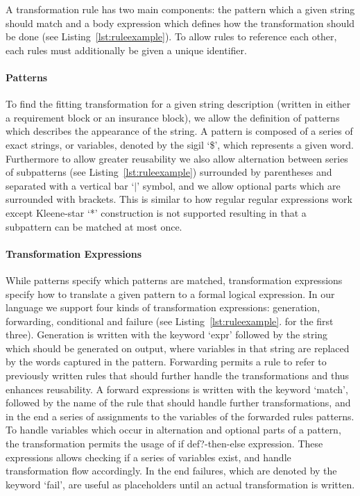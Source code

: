 A transformation rule has two main components: the pattern which a given
string should match and a body expression which defines how the
transformation should be done (see Listing~\ref{lst:ruleexample}).
To allow rules to reference each other, each rules must additionally be
given a unique identifier.

\paragraph{Patterns}
\label{par:Patterns}

To find the fitting transformation for a given string description
(written in either a requirement block or an insurance block), we allow the
definition of patterns which describes the appearance of the string.
A pattern is composed of a series of exact strings, or variables,
denoted by the sigil `\$', which represents a given word.
Furthermore to allow greater reusability we also allow alternation between
series of subpatterns (see Listing~\ref{lst:ruleexample}) surrounded by parentheses and
separated with a vertical bar `$\vert$' symbol, and we allow optional parts which are
surrounded with brackets.  This is similar to how regular regular
expressions work except Kleene-star `*' construction is not supported
resulting in that a subpattern can be matched at most once.

\paragraph{Transformation Expressions}
\label{par:Transformation Expressions}
While patterns specify which patterns are matched, transformation expressions
specify how to translate a given pattern to a formal logical expression.
In our language we support four kinds of transformation expressions:
generation, forwarding, conditional and failure (see Listing~\ref{lst:ruleexample}. for the first three).
Generation is written with the keyword `expr'
followed by the string which should be generated on output, where variables
in that string are replaced by the words captured in the pattern.
Forwarding permits a rule to refer to previously written rules that should further handle the
transformations and thus enhances reusability.
A forward expressions is written with the keyword `match',
followed by the name of the rule that should handle further transformations,
and in the end a series of assignments to the variables of the forwarded
rules patterns.
To handle variables which occur in alternation and optional parts of a
pattern, the transformation permits the usage of if def?-then-else expression.
These expressions allows checking if a series of variables exist,
and handle transformation flow accordingly.
In the end failures, which are denoted by the keyword `fail',
are useful as placeholders until an actual transformation is written.

